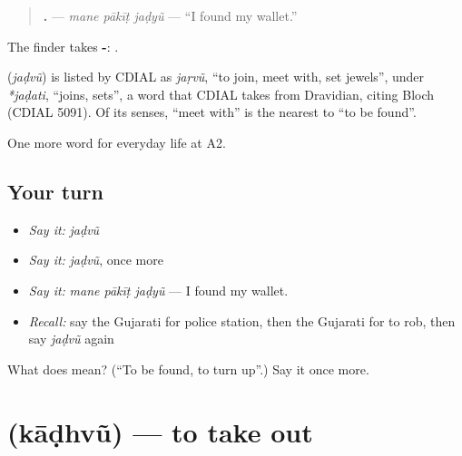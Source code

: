 \begin{quote}
\textbf{  .} — \emph{mane pākīṭ jaḍyũ} — \textquotedblleft{}I found my wallet.\textquotedblright{}
\end{quote}

The finder takes \textbf{-}: \textbf{ }.

\begin{cousinweb}
\textbf{} (\emph{jaḍvũ}) is listed by CDIAL as \emph{jaṛvũ}, \textquotedblleft{}to join, meet with, set jewels\textquotedblright{}, under \emph{*jaḍati}, \textquotedblleft{}joins, sets\textquotedblright{}, a word that CDIAL takes from Dravidian, citing Bloch (CDIAL 5091). Of its senses, \textquotedblleft{}meet with\textquotedblright{} is the nearest to \textquotedblleft{}to be found\textquotedblright{}.
\end{cousinweb}

\begin{grammarlens}[title={What you've built}]
One more word for everyday life at A2.
\end{grammarlens}

\subsection*{Your turn}
\begin{itemize}
\raggedright
  \item \emph{Say it:} \emph{jaḍvũ}
  \item \emph{Say it:} \emph{jaḍvũ}, once more
  \item \emph{Say it:} \emph{mane pākīṭ jaḍyũ} — I found my wallet.
  \item \emph{Recall:} say the Gujarati for police station, then the Gujarati for to rob, then say \emph{jaḍvũ} again
\end{itemize}

\begin{tcolorbox}[breakable,colback=teal!4,colframe=teal!35!black,title={Before you move on}]
What does  mean? (\textquotedblleft{}To be found, to turn up\textquotedblright{}.) Say it once more.
\end{tcolorbox}
\section[\texorpdfstring{\gu{કાઢવું} (kāḍhvũ)}{કાઢવું (kāḍhvũ)}]{ (kāḍhvũ) — to take out}

\label{lesson:GU-C202-kadhvu}



